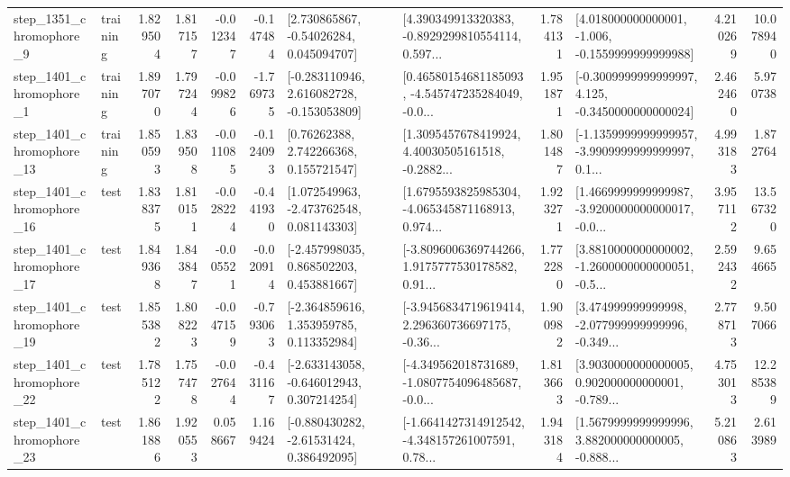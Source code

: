 \begin{tabular}{llrrrrllrlrr}
  step\_1351\_chromophore\_9 &  training &      1.829504 &    1.817157 &     -0.012347 & -0.147484 &     [2.730865867, -0.54026284, 0.045094707] &  [4.390349913320383, -0.8929299810554114, 0.597... &       1.784131 &   [4.018000000000001, -1.006, -0.1559999999999988] &            4.210269 &         10.078940 \\
  step\_1401\_chromophore\_1 &  training &      1.897070 &    1.797244 &     -0.099826 & -1.769735 &   [-0.283110946, 2.616082728, -0.153053809] &  [0.46580154681185093, -4.545747235284049, -0.0... &       1.951871 &  [-0.3009999999999997, 4.125, -0.3450000000000024] &            2.462460 &          5.970738 \\
 step\_1401\_chromophore\_13 &  training &      1.850593 &    1.839508 &     -0.011085 & -0.124093 &      [0.76262388, 2.742266368, 0.155721547] &  [1.3095457678419924, 4.40030505161518, -0.2882... &       1.801487 &  [-1.1359999999999957, -3.9909999999999997, 0.1... &            4.993183 &          1.872764 \\
 step\_1401\_chromophore\_16 &      test &      1.838375 &    1.810151 &     -0.028224 & -0.441930 &    [1.072549963, -2.473762548, 0.081143303] &  [1.6795593825985304, -4.065345871168913, 0.974... &       1.923271 &  [1.4669999999999987, -3.9200000000000017, -0.0... &            3.957112 &         13.567320 \\
 step\_1401\_chromophore\_17 &      test &      1.849368 &    1.843847 &     -0.005521 & -0.020914 &    [-2.457998035, 0.868502203, 0.453881667] &  [-3.8096006369744266, 1.9175777530178582, 0.91... &       1.772280 &  [3.8810000000000002, -1.2600000000000051, -0.5... &            2.592432 &          9.654665 \\
 step\_1401\_chromophore\_19 &      test &      1.855382 &    1.808223 &     -0.047159 & -0.793063 &    [-2.364859616, 1.353959785, 0.113352984] &  [-3.9456834719619414, 2.296360736697175, -0.36... &       1.900982 &  [3.474999999999998, -2.077999999999996, -0.349... &            2.778713 &          9.507066 \\
 step\_1401\_chromophore\_22 &      test &      1.785122 &    1.757478 &     -0.027644 & -0.431167 &   [-2.633143058, -0.646012943, 0.307214254] &  [-4.349562018731689, -1.0807754096485687, -0.0... &       1.813663 &  [3.9030000000000005, 0.902000000000001, -0.789... &            4.753013 &         12.285389 \\
 step\_1401\_chromophore\_23 &      test &      1.861886 &    1.920553 &      0.058667 &  1.169424 &    [-0.880430282, -2.61531424, 0.386492095] &  [-1.6641427314912542, -4.348157261007591, 0.78... &       1.943184 &  [1.5679999999999996, 3.882000000000005, -0.888... &            5.210863 &          2.613989 \\

\end{tabular}
